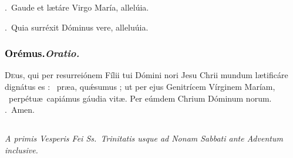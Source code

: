 \documentclass[12pt]{article} %
\newenvironment{rubric}{\color{benred8} \itshape \leftskip 0in \setlength{\parindent}{0.25in}}{\vspace{2 mm}}
\newenvironment{response}{\leftskip 0in \setlength{\parindent}{0in}}{\vspace{2 mm}}
\let\oldgresixstar\gresixstar
\renewcommand{\gresixstar}{\textcolor{benred8}{\oldgresixstar}}
\let\oldgredagger\gredagger
\renewcommand{\gredagger}{\textcolor{benred8}{\oldgredagger}}
\let\oldVbar\Vbar
\renewcommand{\Vbar}{\textcolor{benred8}{\oldVbar .}}
\let\oldRbar\Rbar
\renewcommand{\Rbar}{\textcolor{benred8}{\oldRbar .}}
\def\capitulumSpace{\hspace{20 mm}}
\begin{document}

\gresetfirstlineaboveinitial{\small \textsc{ \textbf{\textcolor{benred8}{VI}}}}{\small \textsc{ \textbf{\textcolor{benred8}{VI}}}}

\vspace{2mm}

\begin{response}
\Vbar\ Gaude et l\ae t\'{a}re Virgo Mar\'{i}a, allel\'{u}ia.

\Rbar\ Quia surr\'{e}xit D\'{o}minus vere, allelu\'{u}ia.

\end{response}

\subsubsection*{\textcolor{black}{Or\'{e}mus.}\capitulumSpace \emph{Oratio.}}

\begin{response}\lettrine{D}{e}us, qui per resurrei\'{o}nem F\'{i}lii tui D\'{o}mini nori Jesu Chrii mundum l\ae tific\'{a}re dign\'{a}tus es : \gredagger\ pr\ae{}a, qu\'{\ae}sumus ; ut per ejus Genitr\'{i}cem V\'{i}rginem Mar\'{i}am, \gresixstar\ perp\'{e}tu\ae\ capi\'{a}mus g\'{a}udia vit\ae . Per e\'{u}mdem Chrium D\'{o}minum norum. \Rbar\ Amen.

\end{response}


\subsection*{}

\begin{rubric}
A primis Vesperis Fei Ss.~Trinitatis usque ad Nonam Sabbati ante Adventum inclusive.

\end{rubric}


{\grespacelinestext=4.60mm
\gresetfirstlineaboveinitial{\small \textsc{ \textbf{\textcolor{benred8}{I}}}}{\small \textsc{ \textbf{\textcolor{benred8}{I}}}}

}
\end{document}
